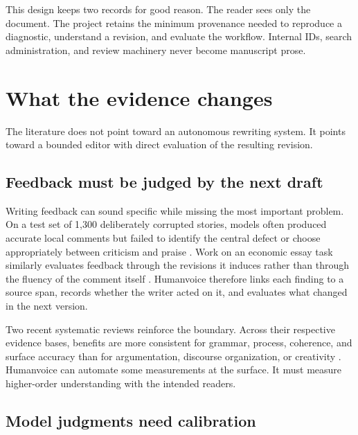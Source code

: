 \documentclass[
  11pt,
  english,
]{article}
\begin{document}
This design keeps two records for good reason. The reader sees only the
document. The project retains the minimum provenance needed to reproduce
a diagnostic, understand a revision, and evaluate the workflow. Internal
IDs, search administration, and review machinery never become manuscript
prose.

\hypertarget{what-the-evidence-changes}{%
\section{What the evidence changes}\label{what-the-evidence-changes}}

The literature does not point toward an autonomous rewriting system. It
points toward a bounded editor with direct evaluation of the resulting
revision.

\hypertarget{feedback-must-be-judged-by-the-next-draft}{%
\subsection{Feedback must be judged by the next
draft}\label{feedback-must-be-judged-by-the-next-draft}}

Writing feedback can sound specific while missing the most important
problem. On a test set of 1,300 deliberately corrupted stories, models
often produced accurate local comments but failed to identify the
central defect or choose appropriately between criticism and praise
\citep{rashkin2025story}. Work on an economic essay task similarly
evaluates feedback through the revisions it induces rather than through
the fluency of the comment itself \citep{nair2024closing}. Humanvoice
therefore links each finding to a source span, records whether the
writer acted on it, and evaluates what changed in the next version.

Two recent systematic reviews reinforce the boundary. Across their
respective evidence bases, benefits are more consistent for grammar,
process, coherence, and surface accuracy than for argumentation,
discourse organization, or creativity
\citep{meng2026systematic, abudalfa2026awe}. Humanvoice can automate
some measurements at the surface. It must measure higher-order
understanding with the intended readers.

\hypertarget{model-judgments-need-calibration}{%
\subsection{Model judgments need
calibration}\label{model-judgments-need-calibration}}
\end{document}
